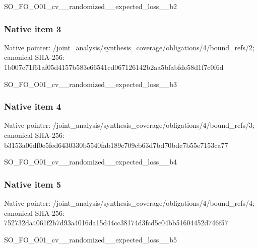 \documentclass[10pt,a4paper]{article}
\begin{document}
\begingroup\raggedright\sloppy SO\_\allowbreak{}FO\_\allowbreak{}O01\_\allowbreak{}cv\_\allowbreak{}\_\allowbreak{}randomized\_\allowbreak{}\_\allowbreak{}expected\_\allowbreak{}loss\_\allowbreak{}\_\allowbreak{}b2\par\endgroup

\subsubsection{Native item 3}
Native pointer: /joint\_\allowbreak{}analysis/synthesis\_\allowbreak{}coverage/obligations/4/bound\_\allowbreak{}refs/2; canonical SHA-256: 1b007c71f61af05d4157b583e66541cd067126142b2aa5bfabfde58d1f7c0f6d

\begingroup\raggedright\sloppy SO\_\allowbreak{}FO\_\allowbreak{}O01\_\allowbreak{}cv\_\allowbreak{}\_\allowbreak{}randomized\_\allowbreak{}\_\allowbreak{}expected\_\allowbreak{}loss\_\allowbreak{}\_\allowbreak{}b3\par\endgroup

\subsubsection{Native item 4}
Native pointer: /joint\_\allowbreak{}analysis/synthesis\_\allowbreak{}coverage/obligations/4/bound\_\allowbreak{}refs/3; canonical SHA-256: b3153a06df0e5fed6430330b5540fab189e709cb63d7bd70bdc7b55e7153ca77

\begingroup\raggedright\sloppy SO\_\allowbreak{}FO\_\allowbreak{}O01\_\allowbreak{}cv\_\allowbreak{}\_\allowbreak{}randomized\_\allowbreak{}\_\allowbreak{}expected\_\allowbreak{}loss\_\allowbreak{}\_\allowbreak{}b4\par\endgroup

\subsubsection{Native item 5}
Native pointer: /joint\_\allowbreak{}analysis/synthesis\_\allowbreak{}coverage/obligations/4/bound\_\allowbreak{}refs/4; canonical SHA-256: 752732da4061f2b7d93a4016da15d44cc38174d3fcd5c04bb51604452d746f57

\begingroup\raggedright\sloppy SO\_\allowbreak{}FO\_\allowbreak{}O01\_\allowbreak{}cv\_\allowbreak{}\_\allowbreak{}randomized\_\allowbreak{}\_\allowbreak{}expected\_\allowbreak{}loss\_\allowbreak{}\_\allowbreak{}b5\par\endgroup
\end{document}
